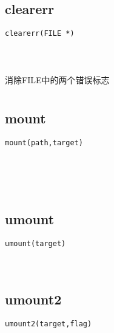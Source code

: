 \documentclass[10pt,a4paper]{article}
\begin{document}
\subsection{clearerr}
\begin{spacing}{2.0}
\lstset{language=C,numbers=none}
\begin{lstlisting}
clearerr(FILE *)
\end{lstlisting}
{\large\color[rgb]{0.2,0.4,0.6}{*:}}
\paragraph{ \ \ }消除FILE中的两个错误标志
\end{spacing}

\section{\color[rgb]{0.2,0.4,0.6}{文件系统挂载}}
\subsection{mount}
\begin{spacing}{2.0}
\lstset{language=C,numbers=none}
\begin{lstlisting}
mount(path,target)
\end{lstlisting}
{\large\color[rgb]{0.2,0.4,0.6}{path:}} \\
{\large\color[rgb]{0.2,0.4,0.6}{target:}}
\paragraph{ \ \ }
\end{spacing}

\subsection{umount}
\begin{spacing}{2.0}
\lstset{language=C,numbers=none}
\begin{lstlisting}
umount(target)
\end{lstlisting}
{\large\color[rgb]{0.2,0.4,0.6}{target:}}
\paragraph{ \ \ }
\end{spacing}

\subsection{umount2}
\begin{spacing}{2.0}
\lstset{language=C,numbers=none}
\begin{lstlisting}
umount2(target,flag)
\end{lstlisting}
{\large\color[rgb]{0.2,0.4,0.6}{target:}} \\
{\large\color[rgb]{0.2,0.4,0.6}{flag:}}
\paragraph{ \ \ }
\end{spacing}
\end{document}
